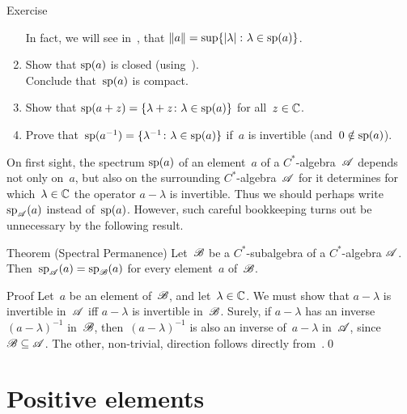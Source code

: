 \documentclass[a]{subfiles}
\begin{document}
\begin{parsec}
\begin{point}{Exercise}
\begin{enumerate}
In fact, we will see in~,
that $\|a\|=\sup\{\left|\lambda\right|\colon \lambda\in \mathrm{sp}(a)\}$.
\item
Show that $\mathrm{sp}(a)$ is closed (using~).\\
Conclude that~$\mathrm{sp}(a)$ is compact.
\item
Show that $\mathrm{sp}(a+z)=\{\lambda+z\colon \lambda\in\mathrm{sp}(a)\}$
for all~$z\in \mathbb{C}$.
\item
Prove that~$\mathrm{sp}(a^{-1})=\{\lambda^{-1}\colon \lambda\in \mathrm{sp}(a)\}$
if~$a$ is invertible (and~$0\notin \mathrm{sp}(a)$).
\end{enumerate}
\end{point}
\begin{point}%
On first sight,
the spectrum $\mathrm{sp}(a)$
of an element~$a$ of a $C^*$-algebra~$\mathscr{A}$ 
depends not only on~$a$,
but also on the surrounding $C^*$-algebra~$\mathscr{A}$ for it determines
for which~$\lambda\in\mathbb{C}$ the operator $a-\lambda$ is invertible.
Thus we should perhaps write $\mathrm{sp}_{\mathscr{A}}(a)$ instead
of~$\mathrm{sp}(a)$.
However, such careful bookkeeping turns out 
be unnecessary
by the following result.
\end{point}
\begin{point}{Theorem (Spectral Permanence)}%
Let~$\mathscr{B}$ be a $C^*$-subalgebra of a $C^*$-algebra $\mathscr{A}$.
Then~$\mathrm{sp}_{\mathscr{A}}(a)=\mathrm{sp}_{\mathscr{B}}(a)$
for every element~$a$ of~$\mathscr{B}$.
\begin{point}{Proof}%
Let~$a$ be an element of~$\mathscr{B}$,
and let~$\lambda\in \mathbb{C}$.
We must show that $a-\lambda$ is invertible in~$\mathscr{A}$
iff $a-\lambda$ is invertible in~$\mathscr{B}$.
Surely,
if $a-\lambda$ has an inverse $(a-\lambda)^{-1}$ in~$\mathscr{B}$,
then~$(a-\lambda)^{-1}$ is also an inverse of~$a-\lambda$ in~$\mathscr{A}$,
since~$\mathscr{B}\subseteq \mathscr{A}$.
The other, non-trivial, direction follows
directly from~.\qed%
\end{point}
\end{point}
\end{parsec}
\section{Positive elements}
\end{document}
